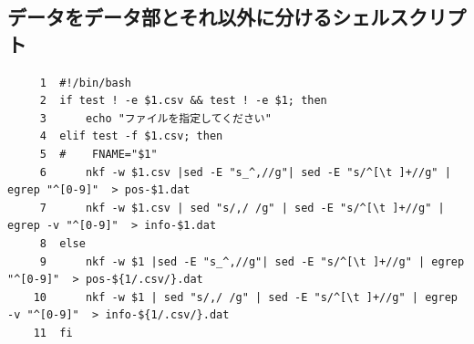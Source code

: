 \documentclass{jsarticle}
\begin{document}
\subsection{データをデータ部とそれ以外に分けるシェルスクリプト}
\scriptsize
\begin{verbatim}
     1	#!/bin/bash
     2	if test ! -e $1.csv && test ! -e $1; then
     3	    echo "ファイルを指定してください"
     4	elif test -f $1.csv; then
     5	#    FNAME="$1"
     6	    nkf -w $1.csv |sed -E "s_^,//g"| sed -E "s/^[\t ]+//g" | egrep "^[0-9]"  > pos-$1.dat
     7	    nkf -w $1.csv | sed "s/,/ /g" | sed -E "s/^[\t ]+//g" | egrep -v "^[0-9]"  > info-$1.dat
     8	else
     9	    nkf -w $1 |sed -E "s_^,//g"| sed -E "s/^[\t ]+//g" | egrep "^[0-9]"  > pos-${1/.csv/}.dat
    10	    nkf -w $1 | sed "s/,/ /g" | sed -E "s/^[\t ]+//g" | egrep -v "^[0-9]"  > info-${1/.csv/}.dat 
    11	fi
\end{verbatim}
\normalsize
\end{document}
